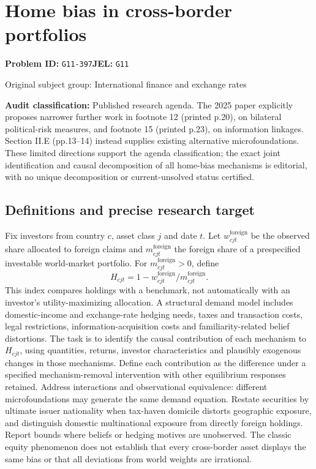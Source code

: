 \documentclass[11pt,a4paper]{article}
\begin{document}
\section*{Home bias in cross-border portfolios}
\textbf{Problem ID:} \texttt{G11-397}\quad \textbf{JEL:} \texttt{G11}\par
\label{problem:OP-0338}
{\sffamily\small\color{muted}Original subject group: International finance and exchange rates\par}
\label{definitions:problem:30007620}
\textbf{Audit classification:} Published research agenda. The 2025 paper explicitly proposes narrower further work in footnote 12 (printed p.20), on bilateral political-risk measures, and footnote 15 (printed p.23), on information linkages. Section II.E (pp.13--14) instead supplies existing alternative microfoundations. These limited directions support the agenda classification; the exact joint identification and causal decomposition of all home-bias mechanisms is editorial, with no unique decomposition or current-unsolved status certified.
\subsection*{Definitions and precise research target}
Fix investors from country \(c\), asset class \(j\) and date \(t\). Let \(w_{cjt}^{\mathrm{foreign}}\) be the observed share allocated to foreign claims and \(m_{cjt}^{\mathrm{foreign}}\) the foreign share of a prespecified investable world-market portfolio. For \(m_{cjt}^{\mathrm{foreign}}>0\), define
\[H_{cjt}=1-w_{cjt}^{\mathrm{foreign}}/m_{cjt}^{\mathrm{foreign}}.\]
This index compares holdings with a benchmark, not automatically with an investor's utility-maximizing allocation. A structural demand model includes domestic-income and exchange-rate hedging needs, taxes and transaction costs, legal restrictions, information-acquisition costs and familiarity-related belief distortions. The task is to identify the causal contribution of each mechanism to \(H_{cjt}\), using quantities, returns, investor characteristics and plausibly exogenous changes in those mechanisms. Define each contribution as the difference under a specified mechanism-removal intervention with other equilibrium responses retained. Address interactions and observational equivalence: different microfoundations may generate the same demand equation. Restate securities by ultimate issuer nationality when tax-haven domicile distorts geographic exposure, and distinguish domestic multinational exposure from directly foreign holdings. Report bounds where beliefs or hedging motives are unobserved. The classic equity phenomenon does not establish that every cross-border asset displays the same bias or that all deviations from world weights are irrational.
\end{document}
